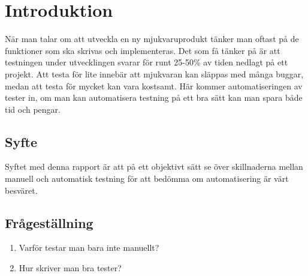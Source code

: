 \section{Introduktion}
\label{sec:david-introduction}
När man talar om att utveckla en ny mjukvaruprodukt tänker man oftast på de funktioner som ska skrivas och implementeras. Det som få tänker på är att testningen under utvecklingen svarar för runt 25-50\% av tiden nedlagt på ett projekt. Att testa för lite innebär att mjukvaran kan släppas med många buggar, medan att testa för mycket kan vara kostsamt. Här kommer automatiseringen av tester in, om man kan automatisera testning på ett bra sätt kan man spara både tid och pengar.

\subsection{Syfte}
Syftet med denna rapport är att på ett objektivt sätt se över skillnaderna mellan manuell och automatisk testning för att bedömma om automatisering är värt besväret. 

\subsection{Frågeställning}
\label{subsec:david-research-questions}


\begin{enumerate}
\item Varför testar man bara inte manuellt?
\item Hur skriver man bra tester?

\end{enumerate}







